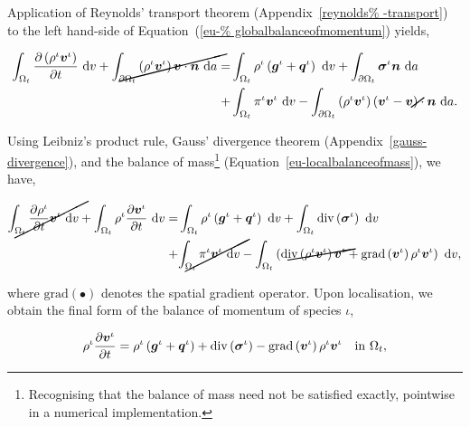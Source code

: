 Application of Reynolds' transport theorem (Appendix~\ref{reynolds%
  -transport}) to the left hand-side of Equation~(\ref{eu-%
  globalbalanceofmomentum}) yields,

\begin{equation*}
\begin{split}
\int_{\Omega_{t}} \frac{\partial
  \left(\rho^{\iota}\bv^{\iota}\right)}{\partial t} \ \mathrm{d}v
+\cancel{\int_{\partial \Omega_{t}}
  \left(\rho^{\iota}\bv^{\iota}\right) \bv \cdot \bn\ \mathrm{d}a} = &
\int_{\Omega_{t}} \rho^{\iota} \left(\bg^{\iota}+\bq^{\iota}\right)
\ \mathrm{d}v + \int_{\partial \Omega_{t}}
\Bsigma^{\iota}\bn\ \mathrm{d}a\\ + & \int_{\Omega_{t}}
\pi^{\iota}\bv^{\iota} \ \mathrm{d}v - \int_{\partial \Omega_{t}}
\left(\rho^{\iota} \bv^{\iota} \right)\left(\bv^{\iota} -
\cancel{\bv}\right) \cdot \bn\ \mathrm{d}a.
\end{split}
\end{equation*}

\noindent Using Leibniz's product rule, Gauss' divergence theorem
(Appendix~\ref{gauss-divergence}), and the balance of
mass{\footnote{Recognising that the balance of mass need not be
    satisfied exactly, pointwise in a numerical implementation.}}
(Equation~\ref{eu-localbalanceofmass}), we have,

\begin{equation*}
\begin{split}
\cancel{\int_{\Omega_{t}} \frac{\partial \rho^{\iota}} {\partial t}
  \bv^{\iota} \ \mathrm{d}v} + \int_{\Omega_{t}} \rho^{\iota}
\frac{\partial \bv^{\iota}} {\partial t} \ \mathrm{d}v = &
\int_{\Omega_{t}} \rho^{\iota} \left(\bg^{\iota}+\bq^{\iota}\right)
\ \mathrm{d}v + \int_{\Omega_{t}}
\mathrm{div}\left(\Bsigma^{\iota}\right)\ \mathrm{d}v\\ + &
\cancel{\int_{\Omega_{t}} \pi^{\iota}\bv^{\iota} \ \mathrm{d}v} -
\int_{\Omega_{t}}\left(\cancel{\mathrm{div}
  \left(\rho^{\iota}\bv^{\iota}\right) \bv^{\iota}} +
\mathrm{grad}\left(\bv^{\iota}\right)
\rho^{\iota}\bv^{\iota}\right)\ \mathrm{d}v,
\end{split}
\end{equation*}

\noindent where $\mathrm{grad} (\bullet)$ denotes the spatial gradient
operator. Upon localisation, we obtain the final form of the balance
of momentum of species $\iota$,

\begin{equation}
\rho^{\iota} \frac{\partial \mbox{\boldmath$ v$}^{\iota}} {\partial t} = \rho^{\iota}
\left(\mbox{\boldmath$ g$}^{\iota}+\mbox{\boldmath$ q$}^{\iota}\right) +
\mathrm{div}\left(\mbox{\boldmath$\sigma$}^{\iota}\right) -
\mathrm{grad}\left(\mbox{\boldmath$ v$}^{\iota}\right) \rho^{\iota}\mbox{\boldmath$ v$}^{\iota} \quad
\mathrm{in}\ \Omega_{t},
\label{eu-localbalanceofmomentum}
\end{equation}

